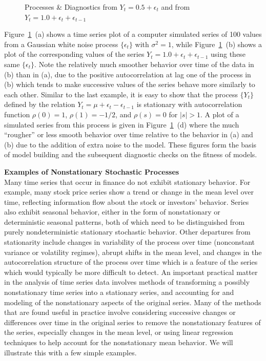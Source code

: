 \begin{ex}
\begin{figure}
{                        }
               \caption{Processes \& Diagnostics from $Y_t = 0.5 + \epsilon_t$ and from $Y_t =1.0 + \epsilon_t + \epsilon_{t-1}$\label{fig:sideways}}
            \end{figure}


Figure~\ref{fig:sideways}~(a) shows a time series plot of a computer simulated series of 100 values from a Gaussian white noise process $\{\epsilon_t\}$ with $\sigma^2=1$, while Figure~\ref{fig:sideways}~(b) shows a plot of the corresponding values of the series $Y_t = 1.0 + \epsilon_{t} + \epsilon_{t-1}$ using these same $\{\epsilon_t\}$.  Note the relatively much smoother behavior over time of the data in (b) than in (a), due to the positive autocorrelation at lag one of the process in (b) which tends to make successive values of the series behave more similarly to each other.  Similar to the last example, it is easy to show that the process $\{Y_t\}$ defined by the relation $Y_t = \mu + \epsilon_{t} - \epsilon_{t-1}$ is stationary with autocorrelation function $\rho(0)=1$, $\rho(1)=-1/2$, and $\rho(s)=0$ for $|s|>1$. A plot of a simulated series from this process is given in Figure~\ref{fig:sideways}~(d) where the much ``rougher'' or less smooth behavior over time relative to the behavior  in (a) and (b) due to the addition of extra noise to the model. These figures form the basis of model building and the subsequent diagnostic checks on the fitness of models. 
\end{ex} 


\noindent \textbf{Examples of Nonstationary Stochastic Processes} \\


Many time series that occur in finance do not exhibit stationary behavior.  For example, many stock price series show a trend or change in the mean level over time, reflecting information flow about the stock or investors' behavior. Series also exhibit seasonal behavior, either in the form of nonstationary or deterministic seasonal patterns, both of which need to be distinguished from purely nondeterministic stationary stochastic behavior. Other departures from stationarity include changes in variability of the process over time (nonconstant variance or volatility regimes), abrupt shifts in the mean level, and changes in the autocorrelation structure of the process over time which is a feature of the series which would typically be more difficult to detect.  An important practical matter in the analysis of time series data involves methods of transforming a possibly nonstationary time series into a stationary series, and accounting for and modeling of the nonstationary aspects of the original series.  Many of the methods that are found useful in practice involve considering successive changes or differences over time in the original series to remove the nonstationary features of the series, especially changes in the mean level, or using linear regression techniques to help account for the nonstationary mean behavior.  We will illustrate this with a few simple examples. 



